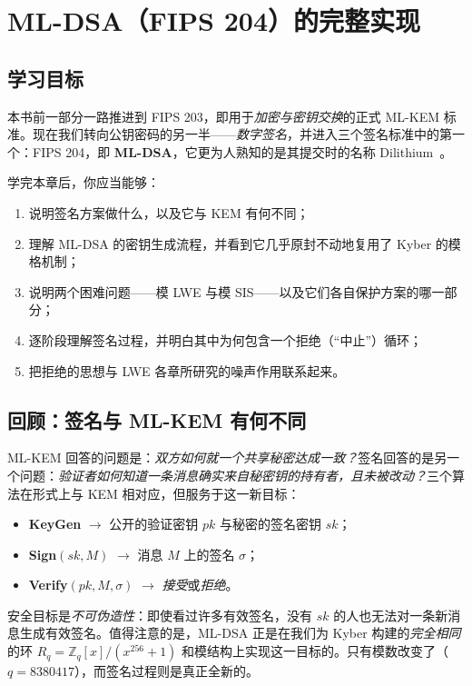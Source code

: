 \chapter{ML-DSA（FIPS 204）的完整实现}
\label{ch:mldsa}

\section{学习目标}

本书前一部分一路推进到 FIPS 203，即用于\emph{加密与密钥交换}的正式 ML-KEM 标准。现在我们转向公钥密码的另一半——\emph{数字签名}，并进入三个签名标准中的第一个：FIPS 204，即 \textbf{ML-DSA}，它更为人熟知的是其提交时的名称 Dilithium~\cite{fips204,dilithium2018}。

学完本章后，你应当能够：

\begin{enumerate}
  \item 说明签名方案做什么，以及它与 KEM 有何不同；
  \item 理解 ML-DSA 的密钥生成流程，并看到它几乎原封不动地复用了 Kyber 的模格机制；
  \item 说明两个困难问题——模 LWE 与模 SIS——以及它们各自保护方案的哪一部分；
  \item 逐阶段理解签名过程，并明白其中为何包含一个拒绝（“中止”）循环；
  \item 把拒绝的思想与 LWE 各章所研究的噪声作用联系起来。
\end{enumerate}

\section{回顾：签名与 ML-KEM 有何不同}

ML-KEM 回答的问题是：\emph{双方如何就一个共享秘密达成一致？}签名回答的是另一个问题：\emph{验证者如何知道一条消息确实来自秘密钥的持有者，且未被改动？}三个算法在形式上与 KEM 相对应，但服务于这一新目标：

\begin{itemize}
  \item \textbf{KeyGen} $\to$ 公开的验证密钥 $pk$ 与秘密的签名密钥 $sk$；
  \item \textbf{Sign}$(sk, M)$ $\to$ 消息 $M$ 上的签名 $\sigma$；
  \item \textbf{Verify}$(pk, M, \sigma)$ $\to$ \emph{接受}或\emph{拒绝}。
\end{itemize}

安全目标是\emph{不可伪造性}：即使看过许多有效签名，没有 $sk$ 的人也无法对一条新消息生成有效签名。值得注意的是，ML-DSA 正是在我们为 Kyber 构建的\emph{完全相同}的环 $R_q = \mathbb{Z}_q[x]/(x^{256}+1)$ 和模结构上实现这一目标的。只有模数改变了（$q = 8380417$），而签名过程则是真正全新的。

